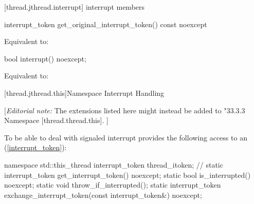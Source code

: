 [thread.jthread.interrupt]{ interrupt members}

{\color{diffcolor}
%
\begin{itemdecl}
interrupt_token get_original_interrupt_token() const noexcept
\end{itemdecl}
\begin{itemdescr}
  \pnum\effects Equivalent to: 
\end{itemdescr}

%
\begin{itemdecl}
bool interrupt() noexcept;
\end{itemdecl}
\begin{itemdescr}
  \pnum\effects Equivalent to: 
\end{itemdescr}
}%

%
%
%

[thread.jthread.this]{Namespace  Interrupt Handling}

{\color{blue}
[{\itshape{}Editorial note:} The  extensions listed here might instead be added
        to "33.3.3 Namespace  [thread.thread.this]. ]
}

To be able to deal with signaled interrupt
 provides the following access to an  (\ref{interrupt_token}):

\begin{codeblock}
namespace std::this_thread {
  interrupt_token thread_itoken;                 // \expos
  static interrupt_token get_interrupt_token() noexcept;
  static bool is_interrupted() noexcept;
  static void throw_if_interrupted();
  static interrupt_token exchange_interrupt_token(const interrupt_token&) noexcept;
}
\end{codeblock}

